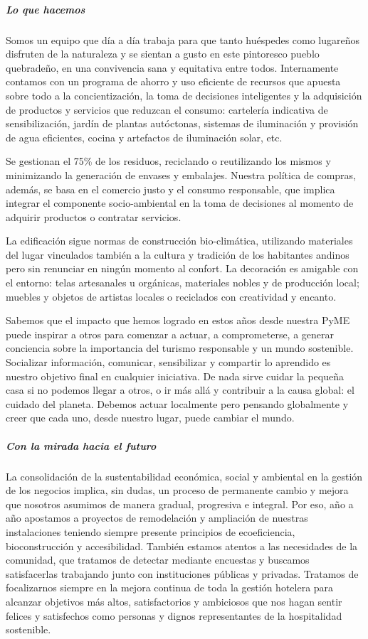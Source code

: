 \documentclass[
]{article}
\begin{document}
\hypertarget{lo-que-hacemos}{%
\subparagraph{Lo que hacemos}\label{lo-que-hacemos}}

Somos un equipo que día a día trabaja para que tanto huéspedes como
lugareños disfruten de la naturaleza y se sientan a gusto en este
pintoresco pueblo quebradeño, en una convivencia sana y equitativa entre
todos. Internamente contamos con un programa de ahorro y uso eficiente
de recursos que apuesta sobre todo a la concientización, la toma de
decisiones inteligentes y la adquisición de productos y servicios que
reduzcan el consumo: cartelería indicativa de sensibilización, jardín de
plantas autóctonas, sistemas de iluminación y provisión de agua
eficientes, cocina y artefactos de iluminación solar, etc.

Se gestionan el 75\% de los residuos, reciclando o reutilizando los
mismos y minimizando la generación de envases y embalajes. Nuestra
política de compras, además, se basa en el comercio justo y el consumo
responsable, que implica integrar el componente socio-ambiental en la
toma de decisiones al momento de adquirir productos o contratar
servicios.

La edificación sigue normas de construcción bio-climática, utilizando
materiales del lugar vinculados también a la cultura y tradición de los
habitantes andinos pero sin renunciar en ningún momento al confort. La
decoración es amigable con el entorno: telas artesanales u orgánicas,
materiales nobles y de producción local; muebles y objetos de artistas
locales o reciclados con creatividad y encanto.

Sabemos que el impacto que hemos logrado en estos años desde nuestra
PyME puede inspirar a otros para comenzar a actuar, a comprometerse, a
generar conciencia sobre la importancia del turismo responsable y un
mundo sostenible. Socializar información, comunicar, sensibilizar y
compartir lo aprendido es nuestro objetivo final en cualquier
iniciativa. De nada sirve cuidar la pequeña casa si no podemos llegar a
otros, o ir más allá y contribuir a la causa global: el cuidado del
planeta. Debemos actuar localmente pero pensando globalmente y creer que
cada uno, desde nuestro lugar, puede cambiar el mundo.

\hypertarget{con-la-mirada-hacia-el-futuro}{%
\subparagraph{Con la mirada hacia el
futuro}\label{con-la-mirada-hacia-el-futuro}}

La consolidación de la sustentabilidad económica, social y ambiental en
la gestión de los negocios implica, sin dudas, un proceso de permanente
cambio y mejora que nosotros asumimos de manera gradual, progresiva e
integral. Por eso, año a año apostamos a proyectos de remodelación y
ampliación de nuestras instalaciones teniendo siempre presente
principios de ecoeficiencia, bioconstrucción y accesibilidad. También
estamos atentos a las necesidades de la comunidad, que tratamos de
detectar mediante encuestas y buscamos satisfacerlas trabajando junto
con instituciones públicas y privadas. Tratamos de focalizarnos siempre
en la mejora continua de toda la gestión hotelera para alcanzar
objetivos más altos, satisfactorios y ambiciosos que nos hagan sentir
felices y satisfechos como personas y dignos representantes de la
hospitalidad sostenible.
\end{document}
